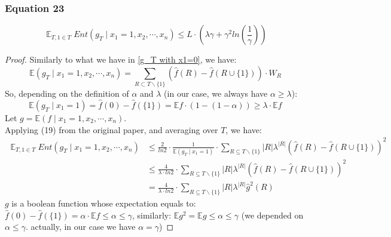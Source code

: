 \documentclass{article}
\begin{document}
			\subsubsection{Equation 23}
				\begin{equation}
					\mathop{\mathbb{E}}_{T,1 \in T} Ent \left( g_T \mid x_1 = 1,x_2, \cdots, x_n \right) \leq L \cdot \left( \lambda \gamma + \gamma^2 ln \left( \frac{1}{\gamma} \right) \right)
				\end{equation}
				\begin{proof}
					Similarly to what we have in \ref{g_T with x1=0}, we have:
					\begin{equation} \label{g_T with x1=1}
						\mathbb{E} \left( g_T \mid x_1 = 1,x_2, \cdots, x_n \right) = \sum_{R \subset T \backslash \{1\}} \left( \hat{f}(R) - \hat{f}(R \cup \{1\}) \right) \cdot W_R
					\end{equation}
					So, depending on the definition of $\alpha$ and $\lambda$ (in our case, we always have $\alpha \geq \lambda$):
					\begin{equation}
						\mathbb{E} \left( g_T \mid x_1=1 \right) = \hat{f} (0) - \hat{f} (\{1\}) = \mathbb{E}f \cdot \left( 1 - \left (1- \alpha \right) \right) \geq \lambda \cdot \mathbb{E} f
					\end{equation}
					Let $g = \mathbb{E} \left( f \mid x_1 = 1,x_2, \cdots, x_n \right)$. \\
					Applying (19) from the original paper, and averaging over $T$, we have:
					\begin{equation} \label{Ent with x_1 = 1 V1} \begin{aligned}
						\mathop{\mathbb{E}}_{T,1 \in T} Ent \left( g_T \mid x_1 = 1,x_2, \cdots, x_n \right) 
						& \leq \frac{2}{ln 2} \cdot \frac{1}{\mathbb{E} \left( g_T \mid x_1=1 \right)} \cdot \sum_{R \subseteq {T\backslash \{1\}}} |R| \lambda^{|R|} \left( \hat{f} (R) - \hat{f} (R \cup \{1\}) \right)^2 \\
						& \leq \frac{4}{\lambda \cdot ln 2} \cdot \sum_{R \subseteq {T\backslash \{1\}}} |R| \lambda^{|R|} \left( \hat{f} (R) - \hat{f} (R \cup \{1\}) \right)^2 \\ 
						& = \frac{4}{\lambda \cdot ln 2} \cdot \sum_{R \subseteq {T\backslash \{1\}}} |R| \lambda^{|R|} \hat{g}^2 (R)
					\end{aligned} 
					\end{equation}
				$g$ is a boolean function whose expectation equals to: $ \hat{f}(0) - \hat{f}(\{1\}) = \alpha \cdot \mathbb{E} f \leq \alpha \leq \gamma $, similarly: $ \mathbb{E}g^2 = \mathbb{E}g \leq \alpha \leq \gamma$ (we depended on $\alpha \leq \gamma$. actually, in our case we have $\alpha = \gamma$)

\end{proof}
\end{document}
